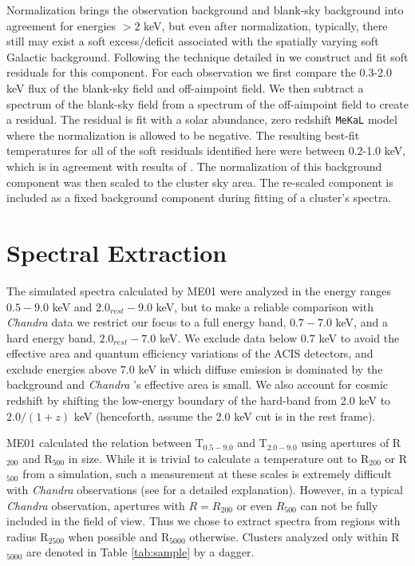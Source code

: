 \documentclass{emulateapj}
\newcommand{\chan}{{\textit{Chandra }}}
\begin{document}
Normalization brings the observation background and blank-sky
background into agreement for energies $> 2$ keV, but even after
normalization, typically, there still may exist a soft excess/deficit
associated with the spatially varying soft Galactic
background. Following the technique detailed in
\cite{2005ApJ...628..655V} we construct and fit soft residuals for
this component. For each observation we first compare the 0.3-2.0 keV
flux of the blank-sky field and off-aimpoint field. We then
subtract a spectrum of the blank-sky field from a spectrum of the
off-aimpoint field to create a residual. The residual is fit
with a solar abundance, zero redshift {\tt MeKaL} model
\citep{1985A&AS...62..197M, 1986A&AS...65..511M, 1992SRON,
1995ApJ...438L.115L} where the normalization is allowed to be
negative. The resulting best-fit temperatures for all of the soft
residuals identified here were between 0.2-1.0 keV, which is in
agreement with results of \cite{2005ApJ...628..655V}. The
normalization of this background component was then scaled to the
cluster sky area. The re-scaled component is included as a fixed
background component during fitting of a cluster's spectra.

\section{Spectral Extraction} \label{sec:extraction}

The simulated spectra calculated by ME01 were analyzed in the energy
ranges $0.5-9.0$ keV and $2.0_{rest}-9.0$ keV, but to make a reliable
comparison with \chan data we restrict our focus to a
full energy band, $0.7-7.0$ keV, and a hard energy band,
$2.0_{rest}-7.0$ keV. We exclude data below $0.7$ keV to avoid the
effective area and quantum efficiency variations of the ACIS
detectors, and exclude energies above $7.0$ keV in which diffuse
emission is dominated by the background and \chan's
effective area is small. We also account for cosmic redshift by
shifting the low-energy boundary of the hard-band from 2.0 keV to
$2.0/(1+z)$ keV (henceforth, assume the 2.0 keV cut is in the rest
frame).

ME01 calculated the relation between T$_{0.5-9.0}$ and T$_{2.0-9.0}$
using apertures of R$_{200}$ and R$_{500}$ in size. While it is
trivial to calculate a temperature out to R$_{200}$ or R$_{500}$ from
a simulation, such a measurement at these scales is extremely
difficult with \chan observations (see
\cite{2005ApJ...628..655V} for a detailed explanation).  However, in a
typical \chan observation, apertures with $R=R_{200}$ or even
$R_{500}$ can not be fully included in the field of view. Thus we
chose to extract spectra from regions with radius R$_{2500}$ when
possible and R$_{5000}$ otherwise. Clusters analyzed only within
R$_{5000}$ are denoted in Table \ref{tab:sample} by a dagger.
\end{document}
